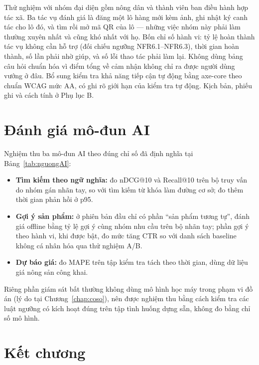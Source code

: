 Thử nghiệm với nhóm đại diện gồm nông dân và thành viên ban điều hành hợp tác xã. Ba tác vụ đánh giá là đăng một lô hàng mới kèm ảnh, ghi nhật ký canh tác cho lô đó, và tìm rồi mở mã QR của lô --- những việc nhóm này phải làm thường xuyên nhất và cũng khó nhất với họ. Bốn chỉ số hành vi: tỷ lệ hoàn thành tác vụ không cần hỗ trợ (đối chiếu ngưỡng NFR6.1--NFR6.3), thời gian hoàn thành, số lần phải nhờ giúp, và số lỗi thao tác phải làm lại. Không dùng bảng câu hỏi chuẩn hóa vì điểm tổng về cảm nhận không chỉ ra được người dùng vướng ở đâu. Bổ sung kiểm tra khả năng tiếp cận tự động bằng axe-core theo chuẩn WCAG mức AA, có ghi rõ giới hạn của kiểm tra tự động. Kịch bản, phiếu ghi và cách tính ở Phụ lục B.


\section{Đánh giá mô-đun AI}
\label{sec:danhgiaAI}

Nghiệm thu ba mô-đun AI theo đúng chỉ số đã định nghĩa tại Bảng~\ref{tab:nguongAI}:

\begin{itemize}
    \item \textbf{Tìm kiếm theo ngữ nghĩa:} đo nDCG@10 và Recall@10 trên bộ truy vấn do nhóm gán nhãn tay, so với tìm kiếm từ khóa làm đường cơ sở; đo thêm thời gian phản hồi ở p95.
    \item \textbf{Gợi ý sản phẩm:} ở phiên bản đầu chỉ có phần ``sản phẩm tương tự'', đánh giá offline bằng tỷ lệ gợi ý cùng nhóm nhu cầu trên bộ nhãn tay; phần gợi ý theo hành vi, khi được bật, đo mức tăng CTR so với danh sách baseline không cá nhân hóa qua thử nghiệm A/B.
    \item \textbf{Dự báo giá:} đo MAPE trên tập kiểm tra tách theo thời gian, dùng dữ liệu giá nông sản công khai.
\end{itemize}

Riêng phần giám sát bất thường không dùng mô hình học máy trong phạm vi đồ án (lý do tại Chương~\ref{chap:coso}), nên được nghiệm thu bằng cách kiểm tra các luật ngưỡng có kích hoạt đúng trên tập tình huống dựng sẵn, không đo bằng chỉ số mô hình.


\section{Kết chương}
\label{sec:thaoluan}

